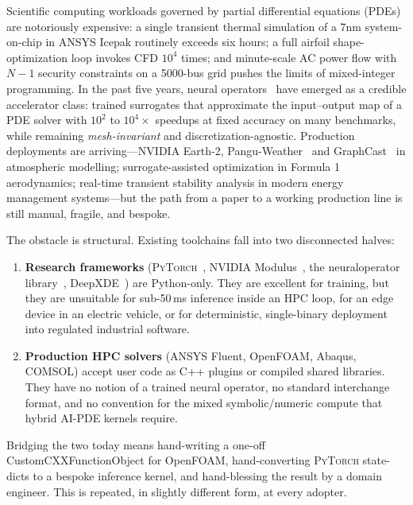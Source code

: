 \documentclass[10pt,twocolumn]{article}
\renewcommand{\texttt}[1]{{\normalfont\ttfamily #1}\normalfont\rmfamily}
\newcommand{\py}{\textsc{PyTorch}}
\begin{document}
Scientific computing workloads governed by partial differential
equations (PDEs) are notoriously expensive: a single transient
thermal simulation of a 7nm system-on-chip in ANSYS Icepak routinely
exceeds six hours; a full airfoil shape-optimization loop invokes
CFD $10^4$ times; and minute-scale AC power flow with $N-1$ security
constraints on a 5000-bus grid pushes the limits of mixed-integer
programming.
%
In the past five years, neural operators~\citep{li2021fno,lu2021deeponet}
have emerged as a credible accelerator class: trained surrogates that
approximate the input--output map of a PDE solver with $10^{2}$ to
$10^{4}\times$ speedups at fixed accuracy on many benchmarks, while
remaining \emph{mesh-invariant} and discretization-agnostic.
Production deployments are arriving---NVIDIA Earth-2,
Pangu-Weather~\citep{bi2023panguweather} and
GraphCast~\citep{lam2023graphcast} in atmospheric modelling;
surrogate-assisted optimization in Formula 1 aerodynamics; real-time
transient stability analysis in modern energy management
systems---but the path from a paper to a working production line is
still manual, fragile, and bespoke.

The obstacle is structural.  Existing toolchains fall into two
disconnected halves:
\begin{enumerate}[leftmargin=*,itemsep=2pt,topsep=2pt]
  \item \textbf{Research frameworks} (\py{}~\citep{paszke2019pytorch},
    NVIDIA Modulus~\citep{modulus2022}, the
    \texttt{neuraloperator} library~\citep{kovachki2023neuraloperator},
    DeepXDE~\citep{lu2021deepxde}) are Python-only.  They are
    excellent for training, but they are unsuitable for sub-50\,ms
    inference inside an HPC loop, for an edge device in an electric
    vehicle, or for deterministic, single-binary deployment into
    regulated industrial software.
  \item \textbf{Production HPC solvers} (ANSYS Fluent, OpenFOAM,
    Abaqus, COMSOL) accept user code as C{++} plugins or compiled
    shared libraries.  They have no notion of a trained neural
    operator, no standard interchange format, and no convention for
    the mixed symbolic/numeric compute that hybrid AI-PDE kernels
    require.
\end{enumerate}
%
Bridging the two today means hand-writing a one-off
\texttt{CustomCXXFunctionObject} for OpenFOAM, hand-converting
\py{} state-dicts to a bespoke inference kernel, and hand-blessing
the result by a domain engineer.  This is repeated, in slightly
different form, at every adopter.
\end{document}
